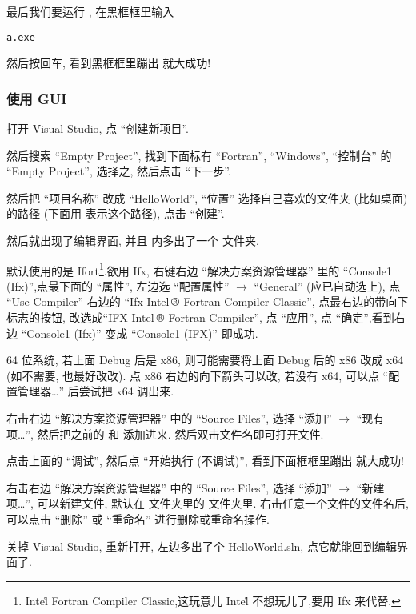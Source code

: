 最后我们要运行 , 在黑框框里输入
\begin{verbatim}
a.exe
\end{verbatim}
然后按回车, 看到黑框框里蹦出  就大成功!

\subsubsection{使用 GUI}

打开 Visual Studio, 点 ``创建新项目''.

然后搜索 ``Empty Project'', 找到下面标有 ``Fortran'', ``Windows'', ``控制台'' 的 ``Empty Project'', 选择之, 然后点击 ``下一步''.

然后把 ``项目名称'' 改成 ``HelloWorld'', ``位置'' 选择自己喜欢的文件夹 (比如桌面) 的路径 (下面用 \ttt{[dir]} 表示这个路径), 点击 ``创建''.

然后就出现了编辑界面, 并且 \ttt{[dir]} 内多出了一个  文件夹.

默认使用的是 Ifort\footnote{Intel\r{} Fortran Compiler Classic,这玩意儿 Intel\r{} 不想玩儿了,要用 Ifx 来代替.}.欲用 Ifx, 右键右边 ``解决方案资源管理器'' 里的 ``Console1 (Ifx)'',点最下面的 ``属性'', 左边选 ``配置属性'' $\rightarrow$ ``General'' (应已自动选上), 点 ``Use Compiler'' 右边的 ``Ifx Intel$\,\text{\textregistered}$ Fortran Compiler Classic'', 点最右边的带向下标志的按钮, 改选成``IFX Intel$\,\text{\textregistered}$ Fortran Compiler'', 点 ``应用'', 点 ``确定'',看到右边 ``Console1 (Ifx)'' 变成 ``Console1 (IFX)'' 即成功.

64 位系统, 若上面 Debug 后是 x86, 则可能需要将上面 Debug 后的 x86 改成 x64 (如不需要, 也最好改改). 点 x86 右边的向下箭头可以改, 若没有 x64, 可以点 ``配置管理器\dots'' 后尝试把 x64 调出来.

右击右边 ``解决方案资源管理器'' 中的 ``Source Files'', 选择 ``添加'' $\rightarrow$ ``现有项\dots'', 然后把之前的  和  添加进来. 然后双击文件名即可打开文件.

点击上面的 ``调试'', 然后点 ``开始执行 (不调试)'', 看到下面框框里蹦出  就大成功!

右击右边 ``解决方案资源管理器'' 中的 ``Source Files'', 选择 ``添加'' $\rightarrow$ ``新建项\dots'', 可以新建文件, 默认在  文件夹里的  文件夹里. 右击任意一个文件的文件名后, 可以点击 ``删除'' 或 ``重命名'' 进行删除或重命名操作.

关掉 Visual Studio, 重新打开, 左边多出了个 HelloWorld.sln, 点它就能回到编辑界面了.

